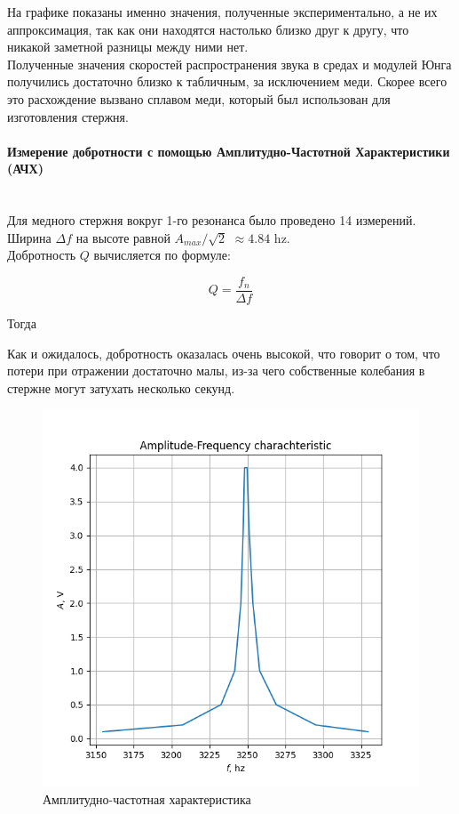 \documentclass[a4paper,12pt]{article}
\begin{document}
	На графике показаны именно значения, полученные экспериментально, а не их аппроксимация, так как они находятся настолько близко друг к другу, что никакой заметной разницы между ними нет.\\
	
	Полученные значения скоростей распространения звука в средах и модулей Юнга получились достаточно близко к табличным, за исключением меди. Скорее всего это расхождение вызвано сплавом меди, который был использован для изготовления стержня.
	
	\paragraph{Измерение добротности с помощью Амплитудно-Частотной Характеристики (АЧХ)}\mbox{}\\
	
	Для медного стержня вокруг 1-го резонанса было проведено 14 измерений. Ширина $\Delta f$ на высоте равной $A_{max}/\sqrt{2}$ $\approx4.84$ hz.\\
	
	Добротность $Q$ вычисляется по формуле:
	
	\begin{equation}
		\label{Q}
		Q=\frac{f_n}{\Delta f}
	\end{equation}
	
	Тогда 
	\begin{center}
	\end{center}
	
	Как и ожидалось, добротность оказалась очень высокой, что говорит о том, что потери при отражении достаточно малы, из-за чего собственные колебания в стержне могут затухать несколько секунд.
	
	\begin{figure}[H]
		\centering
		\includegraphics[width=0.9\linewidth]{fig4}
		\caption{Амплитудно-частотная характеристика}
		\label{fig:fig4}
	\end{figure}
	
\end{document}
